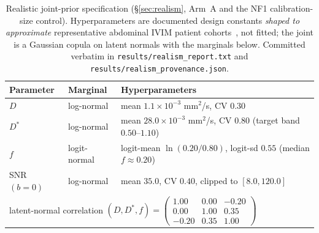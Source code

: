 \documentclass[11pt]{article}
\newcommand{\Dstar}{D^{*}}
\begin{document}
\begin{table}[h]
\centering
\caption{Realistic joint-prior specification (\S\ref{sec:realism}, Arm~A and the NF1
calibration-size control). Hyperparameters are documented design constants
\emph{shaped to approximate} representative abdominal IVIM patient
cohorts~\citep{gurneychampion2018,kaandorp2021,barbieri2020}, not fitted; the joint
is a Gaussian copula on latent normals with the marginals below. Committed verbatim
in \texttt{results/realism\_report.txt} and \texttt{results/realism\_provenance.json}.}
\label{tab:realism-prior}
\begin{tabular}{lll}
\toprule
Parameter & Marginal & Hyperparameters \\
\midrule
$D$          & log-normal   & mean $1.1\times10^{-3}$ mm$^2$/s, CV $0.30$ \\
$\Dstar$     & log-normal   & mean $28.0\times10^{-3}$ mm$^2$/s, CV $0.80$ (target band $0.50$--$1.10$) \\
$f$          & logit-normal & logit-mean $\ln(0.20/0.80)$, logit-sd $0.55$ (median $f\approx0.20$) \\
SNR$(b{=}0)$ & log-normal   & mean $35.0$, CV $0.40$, clipped to $[8.0, 120.0]$ \\
\midrule
\multicolumn{3}{l}{latent-normal correlation $(D,\Dstar,f)=
\left(\begin{smallmatrix}1.00 & 0.00 & -0.20\\ 0.00 & 1.00 & 0.35\\ -0.20 & 0.35 & 1.00\end{smallmatrix}\right)$}\\
\bottomrule
\end{tabular}
\end{table}
\end{document}

